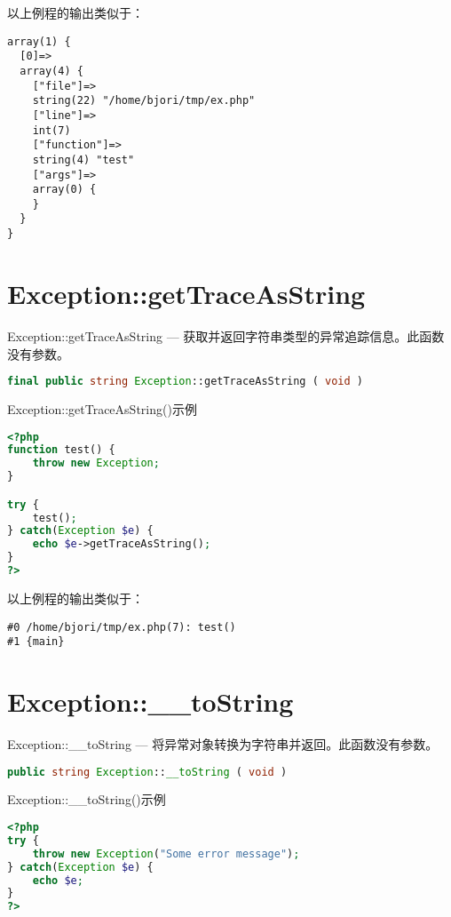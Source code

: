 以上例程的输出类似于：

\begin{verbatim}
array(1) {
  [0]=>
  array(4) {
    ["file"]=>
    string(22) "/home/bjori/tmp/ex.php"
    ["line"]=>
    int(7)
    ["function"]=>
    string(4) "test"
    ["args"]=>
    array(0) {
    }
  }
}
\end{verbatim}


\section{Exception::getTraceAsString}


Exception::getTraceAsString — 获取并返回字符串类型的异常追踪信息。此函数没有参数。


\begin{lstlisting}[language=PHP]
final public string Exception::getTraceAsString ( void )
\end{lstlisting}



\begin{example}
Exception::getTraceAsString()示例
\begin{lstlisting}[language=PHP]
<?php
function test() {
    throw new Exception;
}

try {
    test();
} catch(Exception $e) {
    echo $e->getTraceAsString();
}
?>
\end{lstlisting}
\end{example}

以上例程的输出类似于：

\begin{verbatim}
#0 /home/bjori/tmp/ex.php(7): test()
#1 {main}
\end{verbatim}

\section{Exception::\_\_toString}

Exception::\_\_toString — 将异常对象转换为字符串并返回。此函数没有参数。

\begin{lstlisting}[language=PHP]
public string Exception::__toString ( void )
\end{lstlisting}



\begin{example}
Exception::\_\_toString()示例
\begin{lstlisting}[language=PHP]
<?php
try {
    throw new Exception("Some error message");
} catch(Exception $e) {
    echo $e;
}
?>
\end{lstlisting}
\end{example}

